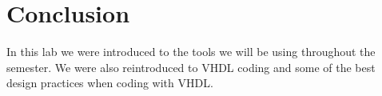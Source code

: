 \documentclass{article}
\begin{document}




\section{Conclusion}
In this lab we were introduced to the tools we will be using throughout the semester. We were also reintroduced to VHDL coding and some of the best design practices when coding with VHDL.



%

%

\end{document}
